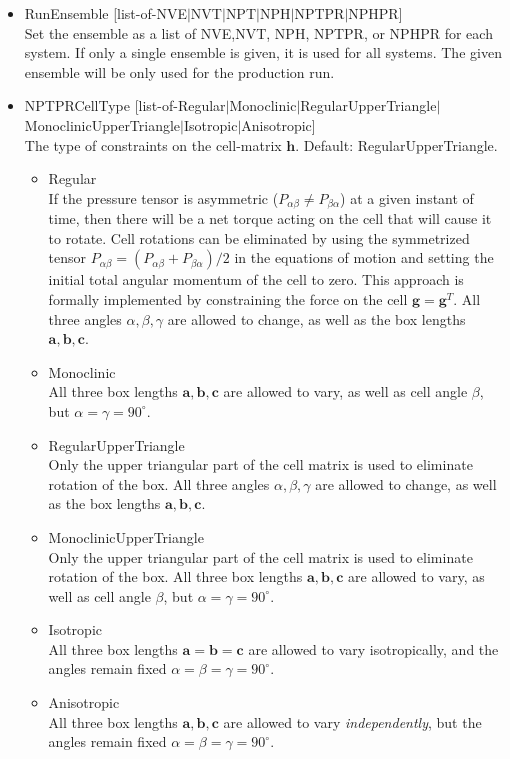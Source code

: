 \begin{itemize}
\item{RunEnsemble [list-of-{\scriptsize NVE$|$NVT$|$NPT$|$NPH$|$NPTPR$|$NPHPR}]}\\
Set the ensemble as a list of NVE,NVT, NPH, NPTPR, or NPHPR for each system. If only a single ensemble is given, it is used for all systems.
The given ensemble will be only used for the production run.
\item{NPTPRCellType [list-of-{\scriptsize Regular$|$Monoclinic$|$RegularUpperTriangle$|$MonoclinicUpperTriangle$|$Isotropic$|$Anisotropic}]}\\
The type of constraints on the cell-matrix $\mathbf{h}$. Default: RegularUpperTriangle.
\begin{itemize}
\item{Regular}\\
If the pressure tensor is asymmetric ($P_{\alpha\beta}\not=P_{\beta\alpha}$) at a given instant of
time, then there will be a net torque acting on the cell that will cause it to rotate. Cell
rotations can be eliminated by using the symmetrized tensor $P_{\alpha\beta}= (P_{\alpha\beta}+P_{\beta\alpha})/2$ in the
equations of motion and setting the initial total angular momentum of the cell to zero.
This approach is formally implemented by constraining the force on the cell $\mathbf{g}=\mathbf{g}^T$.
All three angles $\alpha,\beta,\gamma$ are allowed to change, as well as the box lengths $\mathbf{a},\mathbf{b},\mathbf{c}$.
\item{Monoclinic}\\
All three box lengths $\mathbf{a},\mathbf{b},\mathbf{c}$ are allowed to vary, as well as cell angle $\beta$, but $\alpha=\gamma=90^\circ$.
\item{RegularUpperTriangle}\\
Only the upper triangular part of the cell matrix is used to eliminate rotation of the box.
All three angles $\alpha,\beta,\gamma$ are allowed to change, as well as the box lengths $\mathbf{a},\mathbf{b},\mathbf{c}$.
\item{MonoclinicUpperTriangle}\\
Only the upper triangular part of the cell matrix is used to eliminate rotation of the box.
All three box lengths $\mathbf{a},\mathbf{b},\mathbf{c}$ are allowed to vary, as well as cell angle $\beta$, but $\alpha=\gamma=90^\circ$.
\item{Isotropic}\\
All three box lengths $\mathbf{a}=\mathbf{b}=\mathbf{c}$ are allowed to vary isotropically, and the angles remain fixed $\alpha=\beta=\gamma=90^\circ$.
\item{Anisotropic}\\
All three box lengths $\mathbf{a},\mathbf{b},\mathbf{c}$ are allowed to vary \emph{independently}, but the angles remain fixed $\alpha=\beta=\gamma=90^\circ$.
\end{itemize}

\end{itemize}

